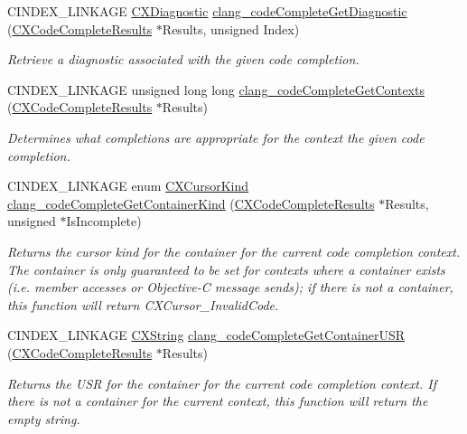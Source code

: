 \begin{DoxyCompactItemize}
C\+I\+N\+D\+E\+X\+\_\+\+L\+I\+N\+K\+A\+GE \hyperlink{group__CINDEX__DIAG_ga44bb8aba7c40590ad25d1763c4fbff7f}{C\+X\+Diagnostic} \hyperlink{group__CINDEX__CODE__COMPLET_gab298febc86d15c50265ff440e6da1913}{clang\+\_\+code\+Complete\+Get\+Diagnostic} (\hyperlink{structCXCodeCompleteResults}{C\+X\+Code\+Complete\+Results} $\ast$Results, unsigned Index)
\begin{DoxyCompactList}\small\item\em Retrieve a diagnostic associated with the given code completion. \end{DoxyCompactList}\item 
C\+I\+N\+D\+E\+X\+\_\+\+L\+I\+N\+K\+A\+GE unsigned long long \hyperlink{group__CINDEX__CODE__COMPLET_ga76f5354e478002585b6bd3aba1d20582}{clang\+\_\+code\+Complete\+Get\+Contexts} (\hyperlink{structCXCodeCompleteResults}{C\+X\+Code\+Complete\+Results} $\ast$Results)
\begin{DoxyCompactList}\small\item\em Determines what completions are appropriate for the context the given code completion. \end{DoxyCompactList}\item 
C\+I\+N\+D\+E\+X\+\_\+\+L\+I\+N\+K\+A\+GE enum \hyperlink{group__CINDEX_gaaccc432245b4cd9f2d470913f9ef0013}{C\+X\+Cursor\+Kind} \hyperlink{group__CINDEX__CODE__COMPLET_ga7a7f0964e4b73192715489125dc9bf7e}{clang\+\_\+code\+Complete\+Get\+Container\+Kind} (\hyperlink{structCXCodeCompleteResults}{C\+X\+Code\+Complete\+Results} $\ast$Results, unsigned $\ast$Is\+Incomplete)
\begin{DoxyCompactList}\small\item\em Returns the cursor kind for the container for the current code completion context. The container is only guaranteed to be set for contexts where a container exists (i.\+e. member accesses or Objective-\/C message sends); if there is not a container, this function will return C\+X\+Cursor\+\_\+\+Invalid\+Code. \end{DoxyCompactList}\item 
C\+I\+N\+D\+E\+X\+\_\+\+L\+I\+N\+K\+A\+GE \hyperlink{structCXString}{C\+X\+String} \hyperlink{group__CINDEX__CODE__COMPLET_gaf45d7f61268af6ec88c70a6fc69d5818}{clang\+\_\+code\+Complete\+Get\+Container\+U\+SR} (\hyperlink{structCXCodeCompleteResults}{C\+X\+Code\+Complete\+Results} $\ast$Results)
\begin{DoxyCompactList}\small\item\em Returns the U\+SR for the container for the current code completion context. If there is not a container for the current context, this function will return the empty string. \end{DoxyCompactList}\item 

\end{DoxyCompactItemize}

